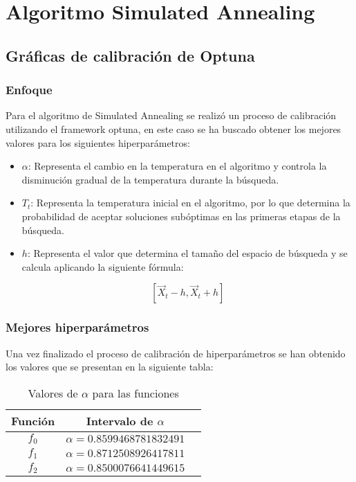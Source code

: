 \section{Algoritmo Simulated Annealing}



\subsection{Gráficas de calibración de Optuna}

\subsubsection{Enfoque}
Para el algoritmo de Simulated Annealing se realizó un proceso de calibración utilizando el framework optuna, en este caso se ha buscado obtener los mejores valores para los siguientes hiperparámetros:

\begin{itemize}
    \item $\alpha$: Representa el cambio en la temperatura en el algoritmo y controla la disminución gradual de la temperatura durante la búsqueda.
    
    \item $T_t$: Representa la temperatura inicial en el algoritmo, por lo que determina la probabilidad de aceptar soluciones subóptimas en las primeras etapas de la búsqueda.
    
    \item $h$: Representa el valor que determina el tamaño del espacio de búsqueda y se calcula aplicando la siguiente fórmula:

    \[
        \left[ \vec{X}_t - h, \vec{X}_t + h \right]
    \]


\end{itemize}

\subsubsection{Mejores hiperparámetros}

Una vez finalizado el proceso de calibración de hiperparámetros se han obtenido los valores que se presentan en la siguiente tabla:

\begin{table}[H]
    \centering
    \caption{Valores de $\alpha$ para las funciones}
    \begin{tabular}{|c|c|c|}
    \hline
    \textbf{Función} & \textbf{Intervalo de $\alpha$} \\
    \hline
    $f_0$ & $\alpha = 0.8599468781832491$ \\
    \hline
    $f_1$ & $\alpha = 0.8712508926417811$ \\
    \hline
    $f_2$ & $\alpha = 0.8500076641449615$ \\
    \hline
    \end{tabular}
    \label{tab:valores-alpha-simul_f0}
\end{table}


